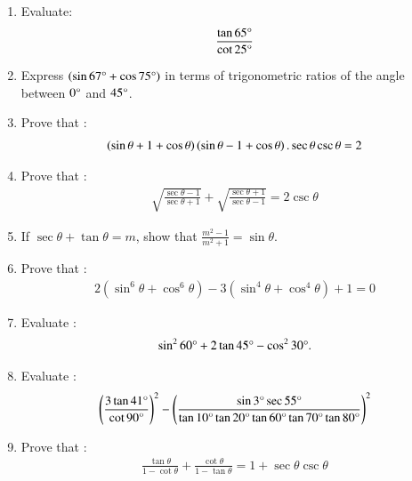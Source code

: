\begin{enumerate}[label=\thesubsection.\arabic*.,ref=\thesubsection.\theenumi]
\item  Evaluate:
\begin{align*}
    \frac {\tan 65\degree}  {\cot 25\degree}
\end{align*}

\hfill{}\item Express $\left({\sin 67\degree}+ {\cos 75\degree}\right)$ in terms of trigonometric ratios of the angle between $0\degree$ and $45\degree$.

\hfill{}\item Prove that :
\begin{align*}
    \left(\sin \theta+1+\cos \theta\right) \left(\sin\theta-1+\cos\theta\right).\sec\theta \csc\theta=2
\end{align*}

\hfill{}\item Prove that :
\begin{align*}
      \sqrt{\frac{\sec\theta-1}{\sec\theta+1}} + \sqrt{\frac{\sec\theta+1}{\sec\theta-1}} = 2\csc\theta
\end{align*}

\hfill{}\item If $\sec\theta + \tan\theta=m$, show that $\frac{m^2-1}{m^2+1} = \sin\theta$.

\hfill{}\item Prove that :
\begin{align*}
    2 (\sin^6\theta +\cos^6\theta) - 3 (\sin^4\theta + \cos^4\theta) + 1 = 0
\end{align*}
\hfill{}

\item Evaluate :
 \begin{align*}
	     \sin^{2}{60\degree} + 2\tan{45\degree} - \cos^{2}{30\degree}. 
      \end{align*}

\hfill{}\item Evaluate :
\begin{align*}
\left(\frac{3\tan 41\degree}{\cot 90\degree}\right)^2 - \left(\frac{\sin 3\degree \sec 55\degree}{\tan 10\degree \tan 20\degree \tan 60\degree \tan 70\degree \tan 80\degree}\right)^2
\end{align*}

\hfill{}\item Prove that :
\begin{align*}
\frac{\tan \theta}{1-\cot \theta} + \frac{\cot \theta}{1- \tan \theta} = 1+ \sec \theta  \csc  \theta   
\end{align*}


\end{enumerate}

